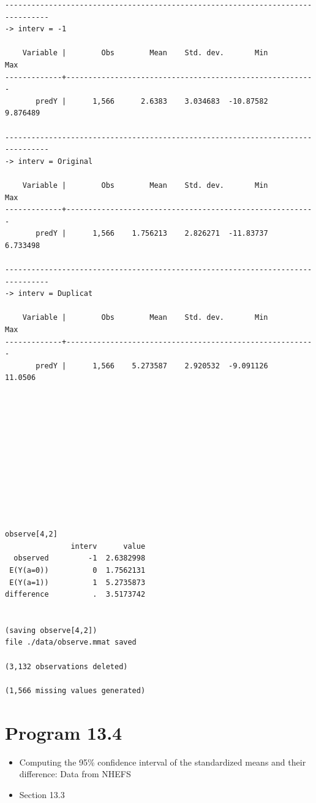 \documentclass[
  10pt,
]{book}
\providecommand{\tightlist}{%
  \setlength{\itemsep}{0pt}\setlength{\parskip}{0pt}}
\begin{document}
\begin{verbatim}
--------------------------------------------------------------------------------
-> interv = -1

    Variable |        Obs        Mean    Std. dev.       Min        Max
-------------+---------------------------------------------------------
       predY |      1,566      2.6383    3.034683  -10.87582   9.876489

--------------------------------------------------------------------------------
-> interv = Original

    Variable |        Obs        Mean    Std. dev.       Min        Max
-------------+---------------------------------------------------------
       predY |      1,566    1.756213    2.826271  -11.83737   6.733498

--------------------------------------------------------------------------------
-> interv = Duplicat

    Variable |        Obs        Mean    Std. dev.       Min        Max
-------------+---------------------------------------------------------
       predY |      1,566    5.273587    2.920532  -9.091126    11.0506












observe[4,2]
               interv      value
  observed         -1  2.6382998
 E(Y(a=0))          0  1.7562131
 E(Y(a=1))          1  5.2735873
difference          .  3.5173742


(saving observe[4,2])
file ./data/observe.mmat saved

(3,132 observations deleted)

(1,566 missing values generated)
\end{verbatim}

\hypertarget{program-13.4-1}{%
\section{Program 13.4}\label{program-13.4-1}}

\begin{itemize}
\tightlist
\item
  Computing the 95\% confidence interval of the standardized means and their difference: Data from NHEFS
\item
  Section 13.3
\end{itemize}
\end{document}

